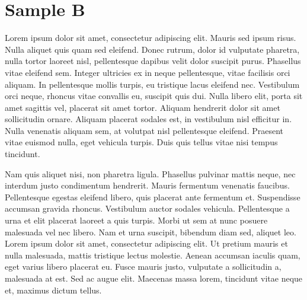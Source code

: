 \chapter{Sample B}

Lorem ipsum dolor sit amet, consectetur adipiscing elit.
Mauris sed ipsum risus.
Nulla aliquet quis quam sed eleifend.
Donec rutrum, dolor id vulputate pharetra, nulla tortor laoreet nisl,
pellentesque dapibus velit dolor suscipit purus.
Phasellus vitae eleifend sem.
Integer ultricies ex in neque pellentesque, vitae facilisis orci aliquam.
In pellentesque mollis turpis, eu tristique lacus eleifend nec.
Vestibulum orci neque, rhoncus vitae convallis eu, suscipit quis dui.
Nulla libero elit, porta sit amet sagittis vel, placerat sit amet tortor.
Aliquam hendrerit dolor sit amet sollicitudin ornare.
Aliquam placerat sodales est, in vestibulum nisl efficitur in.
Nulla venenatis aliquam sem, at volutpat nisl pellentesque eleifend.
Praesent vitae euismod nulla, eget vehicula turpis.
Duis quis tellus vitae nisi tempus tincidunt.

Nam quis aliquet nisi, non pharetra ligula.
Phasellus pulvinar mattis neque, nec interdum justo condimentum hendrerit.
Mauris fermentum venenatis faucibus.
Pellentesque egestas eleifend libero, quis placerat ante fermentum et.
Suspendisse accumsan gravida rhoncus.
Vestibulum auctor sodales vehicula.
Pellentesque a urna et elit placerat laoreet a quis turpis.
Morbi ut sem at nunc posuere malesuada vel nec libero.
Nam et urna suscipit, bibendum diam sed, aliquet leo.
Lorem ipsum dolor sit amet, consectetur adipiscing elit.
Ut pretium mauris et nulla malesuada, mattis tristique lectus molestie.
Aenean accumsan iaculis quam, eget varius libero placerat eu.
Fusce mauris justo, vulputate a sollicitudin a, malesuada at est.
Sed ac augue elit.
Maecenas massa lorem, tincidunt vitae neque et, maximus dictum tellus.
